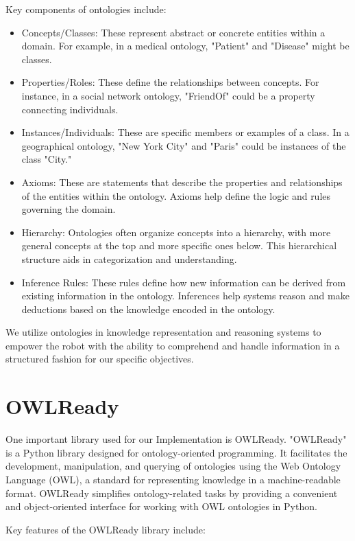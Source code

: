 \documentclass[	pdftex, 
								a4paper,
								11pt, DIV11, BCOR5mm,
								parskip,
								]{scrreprt}
\begin{document}
	Key components of ontologies include:

	\begin{itemize}
		\item Concepts/Classes: These represent abstract or concrete entities within a domain. For example, in a medical ontology, "Patient" and "Disease" might be classes.
		\item Properties/Roles: These define the relationships between concepts. For instance, in a social network ontology, "FriendOf" could be a property connecting individuals.
		\item Instances/Individuals: These are specific members or examples of a class. In a geographical ontology, "New York City" and "Paris" could be instances of the class "City."
		\item Axioms: These are statements that describe the properties and relationships of the entities within the ontology. Axioms help define the logic and rules governing the domain.
		\item Hierarchy: Ontologies often organize concepts into a hierarchy, with more general concepts at the top and more specific ones below. This hierarchical structure aids in categorization and understanding.
		\item Inference Rules: These rules define how new information can be derived from existing information in the ontology. Inferences help systems reason and make deductions based on the knowledge encoded in the ontology.
	\end{itemize}
	We utilize ontologies in knowledge representation and reasoning systems to empower the robot with the ability to comprehend and handle information in a structured fashion for our specific objectives.
	\section*{OWLReady}
	One important library used for our Implementation is OWLReady. "OWLReady" is a Python library designed for ontology-oriented programming. It facilitates the development, manipulation, and querying of ontologies using the Web Ontology Language (OWL), a standard for representing knowledge in a machine-readable format. OWLReady simplifies ontology-related tasks by providing a convenient and object-oriented interface for working with OWL ontologies in Python.

	Key features of the OWLReady library include:
\end{document}
